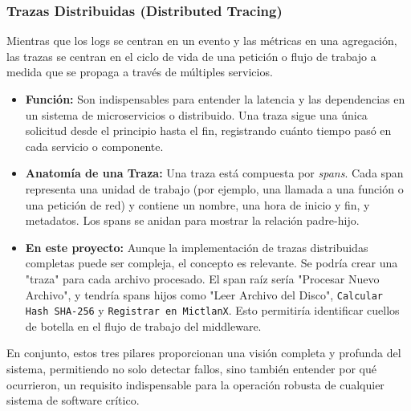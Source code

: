 \subsubsection{Trazas Distribuidas (Distributed Tracing)}
Mientras que los logs se centran en un evento y las métricas en una agregación, las trazas se centran en el ciclo de vida de una petición o flujo de trabajo a medida que se propaga a través de múltiples servicios.
\begin{itemize}
    \item \textbf{Función:} Son indispensables para entender la latencia y las dependencias en un sistema de microservicios o distribuido. Una traza sigue una única solicitud desde el principio hasta el fin, registrando cuánto tiempo pasó en cada servicio o componente.
    \item \textbf{Anatomía de una Traza:} Una traza está compuesta por \textit{spans}. Cada span representa una unidad de trabajo (por ejemplo, una llamada a una función o una petición de red) y contiene un nombre, una hora de inicio y fin, y metadatos. Los spans se anidan para mostrar la relación padre-hijo.
\item \textbf{En este proyecto:} Aunque la implementación de trazas distribuidas completas puede ser compleja, el concepto es relevante. Se podría crear una "traza" para cada archivo procesado. El span raíz sería "Procesar Nuevo Archivo", y tendría spans hijos como "Leer Archivo del Disco", \texttt{Calcular Hash SHA-256} y \texttt{Registrar en MictlanX}. Esto permitiría identificar cuellos de botella en el flujo de trabajo del middleware.
\end{itemize}
En conjunto, estos tres pilares proporcionan una visión completa y profunda del sistema, permitiendo no solo detectar fallos, sino también entender por qué ocurrieron, un requisito indispensable para la operación robusta de cualquier sistema de software crítico.

